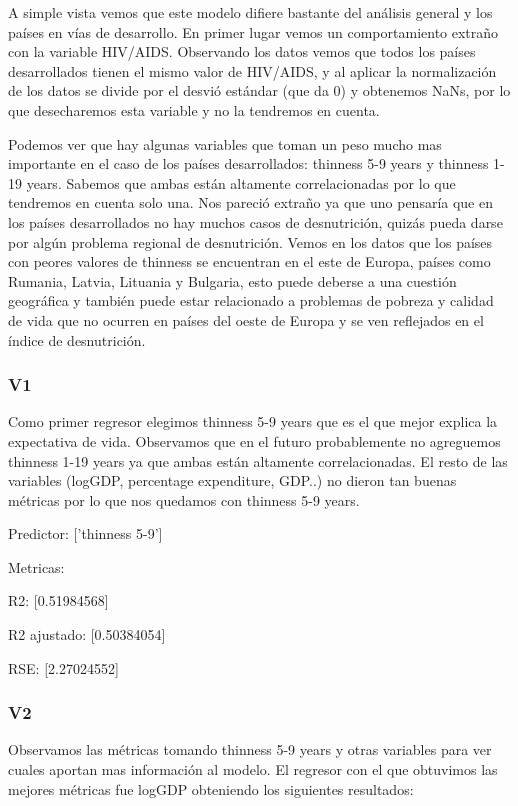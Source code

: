 A simple vista vemos que este modelo difiere bastante del análisis general y los países en vías de desarrollo. En primer lugar vemos un comportamiento extraño con la variable HIV/AIDS. Observando los datos vemos que todos los países desarrollados tienen el mismo valor de HIV/AIDS, y al aplicar la normalización de los datos se divide por el desvió estándar (que da 0) y obtenemos NaNs, por lo que desecharemos esta variable y no la tendremos en cuenta.

Podemos ver que hay algunas variables que toman un peso mucho mas importante en el caso de los países desarrollados: thinness 5-9 years y thinness 1-19 years. Sabemos que ambas están altamente correlacionadas por lo que tendremos en cuenta solo una. Nos pareció extraño ya que uno pensaría que en los países desarrollados no hay muchos casos de desnutrición, quizás pueda darse por algún problema regional de desnutrición. Vemos en los datos que los países con peores valores de thinness se encuentran en el este de Europa, países como Rumania, Latvia, Lituania y Bulgaria, esto puede deberse a una cuestión geográfica y también puede estar relacionado a problemas de pobreza y calidad de vida que no ocurren en países del oeste de Europa y se ven reflejados en el índice de desnutrición. 

\subsubsection{V1}

Como primer regresor elegimos thinness 5-9 years que es el que mejor explica la expectativa de vida. Observamos que en el futuro probablemente no agreguemos thinness 1-19 years ya que ambas están altamente correlacionadas. El resto de las variables (logGDP, percentage expenditure, GDP..) no dieron tan buenas métricas por lo que nos quedamos con thinness 5-9 years.

Predictor: ['thinness 5-9']

Metricas: 

R2: [0.51984568]

R2 ajustado: [0.50384054]

RSE: [2.27024552]

\subsubsection{V2}

Observamos las métricas tomando thinness 5-9 years y otras variables para ver cuales aportan mas información al modelo. El regresor con el que obtuvimos las mejores métricas fue logGDP obteniendo los siguientes resultados:

